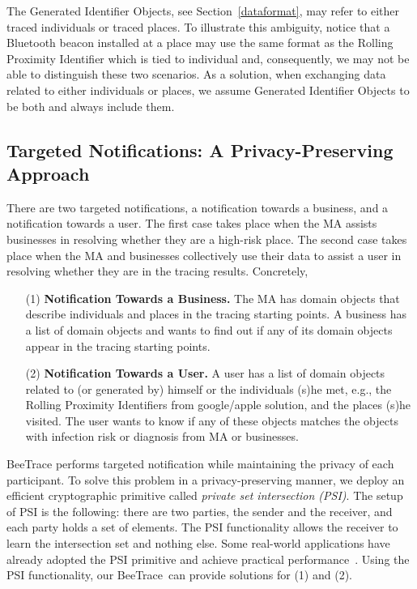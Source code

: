 \documentclass[11pt,dvipdfmx]{article}  %
\newcommand{\sysname}{\textsf{BeeTrace}\xspace}
\begin{document}
The Generated Identifier Objects, see Section~\ref{dataformat}, may refer to either traced individuals or traced places. 
To illustrate this ambiguity, notice that a Bluetooth beacon installed at a place may use the same format as the Rolling Proximity Identifier which is tied to individual and, consequently, we may not be able to distinguish these two scenarios. 
As a solution, when exchanging data related to either individuals or places, we assume Generated Identifier Objects to be both and always include them.

\subsection{Targeted Notifications: A  Privacy-Preserving Approach}
There are two targeted notifications, a notification towards a business, and  a notification towards a user. The first case takes place when the MA assists businesses in resolving  whether they are a high-risk place. The second case takes place when the MA and businesses collectively use their data to assist a user in resolving whether they are in the tracing results. Concretely,

\begin{itemize}
    \item[(1)] \textbf{Notification Towards a Business.} The MA has domain objects that describe individuals and places in the tracing starting points.  A business has a list of domain objects and wants to find out if any of its domain objects appear in the tracing starting points. 
    
    \item[(2)] \textbf{Notification Towards a User.} A user has a list of domain objects related to (or generated  by) himself or the individuals (s)he met, e.g., the Rolling Proximity Identifiers from google/apple solution, and the places (s)he visited. The user wants to know if any of these objects matches the objects with infection risk or diagnosis from MA or businesses. 
\end{itemize}

\sysname performs targeted notification while maintaining the privacy of each participant. 
To solve this problem in a privacy-preserving manner, we deploy an efficient cryptographic primitive called \emph{ private set intersection (PSI)}. 
The setup of PSI is the following: there are two parties, the sender and the receiver, and each party holds a set of elements. 
The PSI functionality allows the receiver to learn the intersection set and nothing else. 
Some real-world applications have already adopted the PSI primitive and achieve practical performance~\cite{Kales2019}. 
Using the PSI functionality, our \sysname\ can provide solutions for (1) and (2). 
\end{document}
